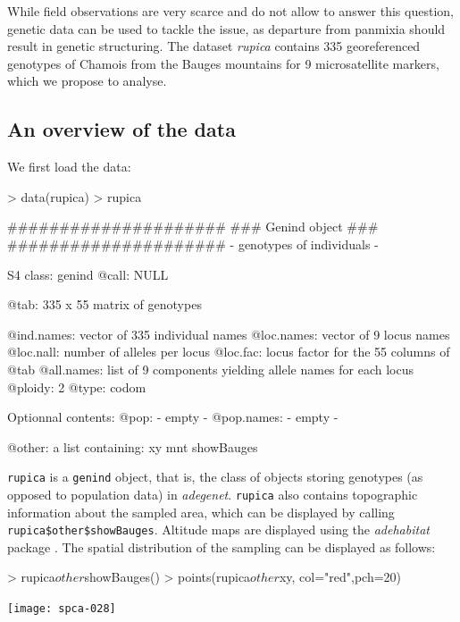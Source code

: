 \documentclass{article}
\begin{document}
While field observations are very scarce and do not allow to answer
this question, genetic data can be used to tackle the issue, as
departure from panmixia should result in genetic structuring.
The dataset \textit{rupica} contains 335 georeferenced genotypes of Chamois from the
Bauges mountains for 9 microsatellite markers, which we propose to
analyse.



\subsection{An overview of the data}
We first load the data:
\begin{Schunk}
\begin{Sinput}
> data(rupica)
> rupica
\end{Sinput}
\begin{Soutput}
   #####################
   ### Genind object ### 
   #####################
- genotypes of individuals - 

S4 class:  genind
@call: NULL

@tab:  335 x 55 matrix of genotypes

@ind.names: vector of  335 individual names
@loc.names: vector of  9 locus names
@loc.nall: number of alleles per locus
@loc.fac: locus factor for the  55 columns of @tab
@all.names: list of  9 components yielding allele names for each locus
@ploidy:  2
@type:  codom

Optionnal contents: 
@pop:  - empty -
@pop.names:  - empty -

@other: a list containing: xy  mnt  showBauges 
\end{Soutput}
\end{Schunk}
\texttt{rupica} is a \texttt{genind} object, that is, the class
of objects storing genotypes (as opposed to population data) in \textit{adegenet}.
\texttt{rupica} also contains topographic information about the
sampled area, which can be displayed by calling
\texttt{rupica\$other\$showBauges}.
Altitude maps are displayed using the \textit{adehabitat} package \cite{tj440}.
The spatial distribution of the sampling can be displayed as follows:
\begin{Schunk}
\begin{Sinput}
> rupica$other$showBauges()
> points(rupica$other$xy, col="red",pch=20)
\end{Sinput}
\end{Schunk}
\texttt{[image: spca-028]}
\end{document}
